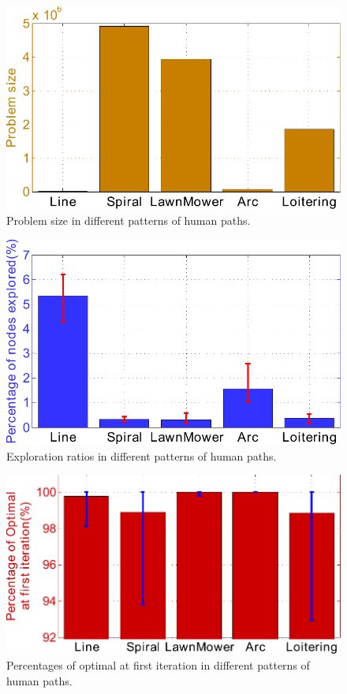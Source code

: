 \begin{figure}
\centering
\includegraphics[width=0.7\linewidth]{./images/ProbSizeInDiffHMP}
\caption{Problem size in different patterns of human paths.}
\label{fig:ProbSizeInDiffHMP}
\end{figure}

\begin{figure}
\centering
\includegraphics[width=0.7\linewidth]{./images/ExpRatioInDiffHMP}
\caption{Exploration ratios in different patterns of human paths.}
\label{fig:ExpRatioInDiffHMP}
\end{figure}

\begin{figure}
\centering
\includegraphics[width=0.7\linewidth]{./images/InitOptInDiffHMP}
\caption{Percentages of optimal at first iteration in different patterns of human paths.}
\label{fig:InitOptInDiffHMP}
\end{figure}
